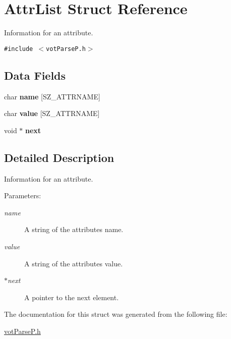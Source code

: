 \hypertarget{structAttrList}{
\section{AttrList Struct Reference}
\label{structAttrList}
}
Information for an attribute.  


{\tt \#include $<$votParseP.h$>$}

\subsection*{Data Fields}
\begin{CompactItemize}
\item 
\hypertarget{structAttrList_217caa5e66c48a418c5e9d8d9b24db50}{
char \textbf{name} \mbox{[}SZ\_\-ATTRNAME\mbox{]}}
\label{structAttrList_217caa5e66c48a418c5e9d8d9b24db50}

\item 
\hypertarget{structAttrList_7e2bb856cf5175ba46ea62c3eb19dded}{
char \textbf{value} \mbox{[}SZ\_\-ATTRNAME\mbox{]}}
\label{structAttrList_7e2bb856cf5175ba46ea62c3eb19dded}

\item 
\hypertarget{structAttrList_2fbe1489ab80694a08f160a359faaf8f}{
void $\ast$ \textbf{next}}
\label{structAttrList_2fbe1489ab80694a08f160a359faaf8f}

\end{CompactItemize}


\subsection{Detailed Description}
Information for an attribute. 

\begin{Desc}
\item[Parameters:]
\begin{description}
\item[{\em name}]A string of the attributes name. \item[{\em value}]A string of the attributes value. \item[{\em $\ast$next}]A pointer to the next element. \end{description}
\end{Desc}


The documentation for this struct was generated from the following file:\begin{CompactItemize}
\item 
\hyperlink{votParseP_8h}{votParseP.h}\end{CompactItemize}

